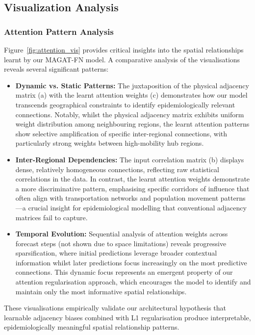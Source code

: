 \documentclass[lettersize, journal]{IEEEtran}
\begin{document}
\subsection{Visualization Analysis}

\subsubsection{Attention Pattern Analysis}
Figure~\ref{fig:attention_vis} provides critical insights into the spatial relationships learnt by our MAGAT-FN model. A comparative analysis of the visualisations reveals several significant patterns:

\begin{itemize}
    \item \textbf{Dynamic vs. Static Patterns:} The juxtaposition of the physical adjacency matrix (a) with the learnt attention weights (c) demonstrates how our model transcends geographical constraints to identify epidemiologically relevant connections. Notably, whilst the physical adjacency matrix exhibits uniform weight distribution among neighbouring regions, the learnt attention patterns show selective amplification of specific inter-regional connections, with particularly strong weights between high-mobility hub regions.
    
    \item \textbf{Inter-Regional Dependencies:} The input correlation matrix (b) displays dense, relatively homogeneous connections, reflecting raw statistical correlations in the data. In contrast, the learnt attention weights demonstrate a more discriminative pattern, emphasising specific corridors of influence that often align with transportation networks and population movement patterns—a crucial insight for epidemiological modelling that conventional adjacency matrices fail to capture.
    
    \item \textbf{Temporal Evolution:} Sequential analysis of attention weights across forecast steps (not shown due to space limitations) reveals progressive sparsification, where initial predictions leverage broader contextual information whilst later predictions focus increasingly on the most predictive connections. This dynamic focus represents an emergent property of our attention regularisation approach, which encourages the model to identify and maintain only the most informative spatial relationships.
\end{itemize}

These visualisations empirically validate our architectural hypothesis that learnable adjacency biases combined with L1 regularisation produce interpretable, epidemiologically meaningful spatial relationship patterns.
\end{document}
